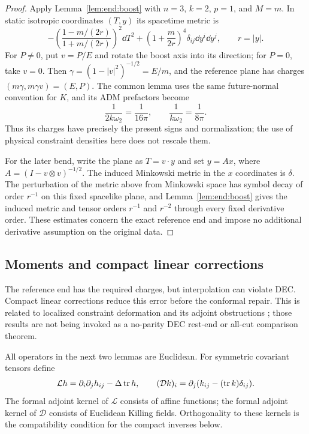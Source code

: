 \begin{proof}
Apply Lemma~\ref{lem:end:boost} with $n=3$, $k=2$, $p=1$, and
$M=m$. In static isotropic coordinates $(T,y)$ its spacetime metric is
\begin{equation}
 \label{n3:reduction:schwarzschild-spacetime}
 -\left(\frac{1-m/(2r)}{1+m/(2r)}\right)^2\dd T^2
       +\left(1+\frac{m}{2r}\right)^4\delta_{ij}\dd y^i\dd y^j,
 \qquad r=|y|.
\end{equation}
For $P\ne0$, put $v=P/E$ and rotate the boost axis into its direction;
for $P=0$, take $v=0$. Then
$\gamma=(1-|v|^2)^{-1/2}=E/m$, and the reference plane has charges
$(m\gamma,m\gamma v)=(E,P)$. The common lemma uses the same
future-normal convention for $K$, and its ADM prefactors become
\[
 \frac1{2k\omega_2}=\frac1{16\pi},\qquad
 \frac1{k\omega_2}=\frac1{8\pi}.
\]
Thus its charges have precisely the present signs and normalization;
the use of physical constraint densities here does not rescale them.

For the later bend, write the plane as $T=v\cdot y$ and set
$y=Ax$, where $A=(I-v\otimes v)^{-1/2}$. The induced Minkowski
metric in the $x$ coordinates is $\delta$. The perturbation of the
metric above from Minkowski space has symbol decay of order $r^{-1}$
on this fixed spacelike plane, and
Lemma~\ref{lem:end:boost} gives the induced metric and tensor orders
$r^{-1}$ and $r^{-2}$ through every fixed derivative order. These
estimates concern the exact reference end and impose no additional
derivative assumption on the original data.
\end{proof}

\subsection{Moments and compact linear corrections}

The reference end has the required charges, but interpolation can
violate DEC. Compact linear corrections reduce this error before the
conformal repair. This is related to localized constraint deformation
and its adjoint obstructions
\cite{CorvinoSchoen2006,ChruscielDelay2003}; those results are not being
invoked as a no-parity DEC rest-end or all-cut comparison theorem.

All operators in the next two lemmas are Euclidean.  For symmetric
covariant tensors define
\begin{equation}
 \label{n3:reduction:linear-operators}
 \mathcal Lh=\partial_i\partial_jh_{ij}-\Delta\operatorname{tr} h,
 \qquad
 (\mathcal Dk)_i=\partial_j(k_{ij}-(\operatorname{tr} k)\delta_{ij}).
\end{equation}
The formal adjoint kernel of $\mathcal L$ consists of affine functions;
the formal adjoint kernel of $\mathcal D$ consists of Euclidean Killing
fields.  Orthogonality to these kernels is the compatibility condition
for the compact inverses below.

